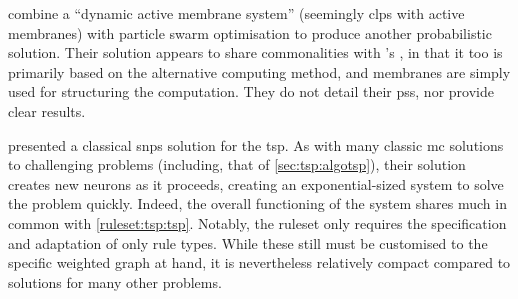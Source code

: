 
\citeauthor{Wei2019} \cite{Wei2019} combine a \enquote{dynamic active membrane system} (seemingly \gls{clps} with active membranes) with particle swarm optimisation \cite{Sun2016} to produce another probabilistic solution.  Their solution appears to share commonalities with \citeauthor{Nishida2006}'s \cite{Nishida2006}, in that it too is primarily based on the alternative computing method, and membranes are simply used for structuring the computation.  They do not detail their \glspl{ps}, nor provide clear results.


\citeauthor{Zhang2019} \cite{Zhang2019} presented a classical \gls{snps} solution for the \gls{tsp}.  As with many classic \gls{mc} solutions to challenging problems \cite{Paun1999a} (including, that of \cref{sec:tsp:algotsp}), their solution creates new neurons as it proceeds, creating an exponential-sized system to solve the problem quickly.  Indeed, the overall functioning of the system shares much in common with \cref{ruleset:tsp:tsp}.  Notably, the \gls{ruleset} only requires the specification and adaptation of only rule types.  While these still must be customised to the specific weighted graph at hand, it is nevertheless relatively compact compared to solutions for many other problems.

